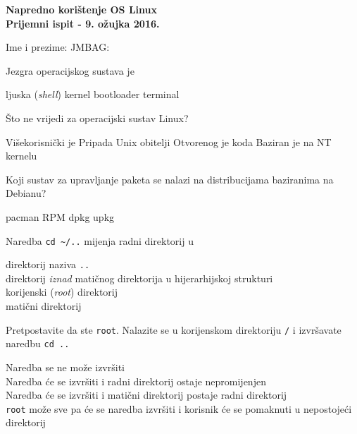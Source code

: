 \documentclass[a4paper,11pt]{exam}
\newcommand{\shell}[1]{\texttt{#1}}
\begin{document}
\firstpageheader
	{}
	{{\large \textbf{Napredno korištenje OS Linux}}\\
		\textbf{Prijemni ispit - 9. ožujka 2016.}}
	{}
\footer
	{}{}{\thepage}
	
Ime i prezime: \fillin[][7cm] \hfill JMBAG: \fillin[][5cm]\\

\begin{questions}
	\question
	Jezgra operacijskog sustava je 
	
	\begin{oneparchoices}
		\choice ljuska (\textit{shell})
		\CorrectChoice kernel 
		\choice bootloader  
		\choice terminal 
	\end{oneparchoices}
	
	\question
	Što ne vrijedi za operacijski sustav Linux?
	
	\begin{oneparchoices}
		\choice Višekorisnički je
		\choice Pripada Unix obitelji
		\choice Otvorenog je koda
		\CorrectChoice Baziran je na NT kernelu
	\end{oneparchoices}
	
	\question
	Koji sustav za upravljanje paketa se nalazi na distribucijama baziranima na Debianu?
	
	\begin{oneparchoices}
		\choice pacman 
		\choice RPM 
		\CorrectChoice dpkg 
		\choice upkg 
	\end{oneparchoices}
	
	\question
    Naredba \shell{cd \textasciitilde/..} mijenja radni direktorij u
    
	\begin{oneparchoices}
		\choice direktorij naziva \shell{..} \\
        \CorrectChoice direktorij \textit{iznad} matičnog direktorija u hijerarhijskoj strukturi \\
        \choice korijenski (\textit{root}) direktorij \\
        \choice matični direktorij 
	\end{oneparchoices}

	\question
    Pretpostavite da ste \shell{root}. Nalazite se u korijenskom direktoriju \shell{/} i izvršavate naredbu \shell{cd ..} 
	
	\begin{oneparchoices}
        \choice Naredba se ne može izvršiti \\
        \CorrectChoice Naredba će se izvršiti i radni direktorij ostaje nepromijenjen \\
        \choice Naredba će se izvršiti i matični direktorij postaje radni direktorij \\
        \choice \shell{root} može sve pa će se naredba izvršiti i korisnik će se pomaknuti u nepostojeći direktorij
	\end{oneparchoices}
	

\end{questions}
\end{document}
